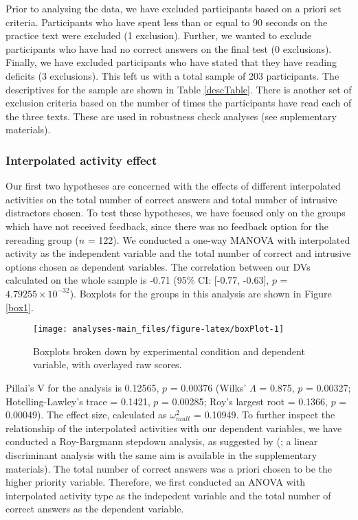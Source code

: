 \documentclass[11pt,]{article}
\begin{document}
Prior to analysing the data, we have excluded participants based on a
priori set criteria. Participants who have spent less than or equal to
90 seconds on the practice text were excluded (1 exclusion). Further, we
wanted to exclude participants who have had no correct answers on the
final test (0 exclusions). Finally, we have excluded participants who
have stated that they have reading deficits (3 exclusions). This left us
with a total sample of 203 participants. The descriptives for the sample
are shown in Table \ref{descTable}. There is another set of exclusion
criteria based on the number of times the participants have read each of
the three texts. These are used in robustness check analyses (see
suplementary materials).

\hypertarget{interpolated-activity-effect}{%
\subsubsection{Interpolated activity
effect}\label{interpolated-activity-effect}}

Our first two hypotheses are concerned with the effects of different
interpolated activities on the total number of correct answers and total
number of intrusive distractors chosen. To test these hypotheses, we
have focused only on the groups which have not received feedback, since
there was no feedback option for the rereading group (\(n\) = 122). We
conducted a one-way MANOVA with interpolated activity as the independent
variable and the total number of correct and intrusive options chosen as
dependent variables. The correlation between our DVs calculated on the
whole sample is -0.71 (95\% CI: {[}-0.77, -0.63{]}, \(p\) =
\(4.79255\times 10^{-32}\)). Boxplots for the groups in this analysis
are shown in Figure \ref{box1}.

\begin{figure*}[h]

{\centering \texttt{[image: analyses-main\_files/figure-latex/boxPlot-1]} 

}

\caption{\label{box1} Boxplots broken down by experimental condition and dependent variable, with overlayed raw scores.}\label{fig:boxPlot}
\end{figure*}

Pillai's V for the analysis is 0.12565, \(p\) = 0.00376 (Wilks'
\(\Lambda\) = 0.875, \(p\) = 0.00327; Hotelling-Lawley's trace = 0.1421,
\(p\) = 0.00285; Roy's largest root = 0.1366, \(p\) = 0.00049). The
effect size, calculated as \(\omega^2_{mult}\) = 0.10949. To further
inspect the relationship of the interpolated activities with our
dependent variables, we have conducted a Roy-Bargmann stepdown analysis,
as suggested by \citeauthor{tabachnick_using_2012}
(\citeyear{tabachnick_using_2012}; a linear discriminant analysis with
the same aim is available in the supplementary materials). The total
number of correct answers was a priori chosen to be the higher priority
variable. Therefore, we first conducted an ANOVA with interpolated
activity type as the indepedent variable and the total number of correct
answers as the dependent variable.
\end{document}
